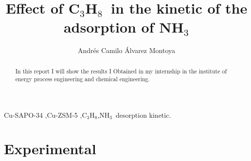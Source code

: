 \documentclass[preprint,12pt]{elsarticle}
\newcommand{\propene}{C$_{3}$H$_{8}$}
\newcommand{\ammonia}{NH$_3$}
\begin{document}
\begin{frontmatter}


\title{Effect of \propene\ in the kinetic of the adsorption of \ammonia}




\author{Andrés Camilo Álvarez Montoya}

\address{Freiberg, Germany}

\begin{abstract}
In this report I will show the results I Obtained in my internship in the institute of energy process engineering and chemical engineering.
\end{abstract}

\begin{keyword}
Cu-SAPO-34 \sep Cu-ZSM-5 \sep \propene \sep \ammonia\ desorption kinetic.


\end{keyword}

\end{frontmatter}

\linenumbers

\section{Experimental}
\label{S:1}
\end{document}
